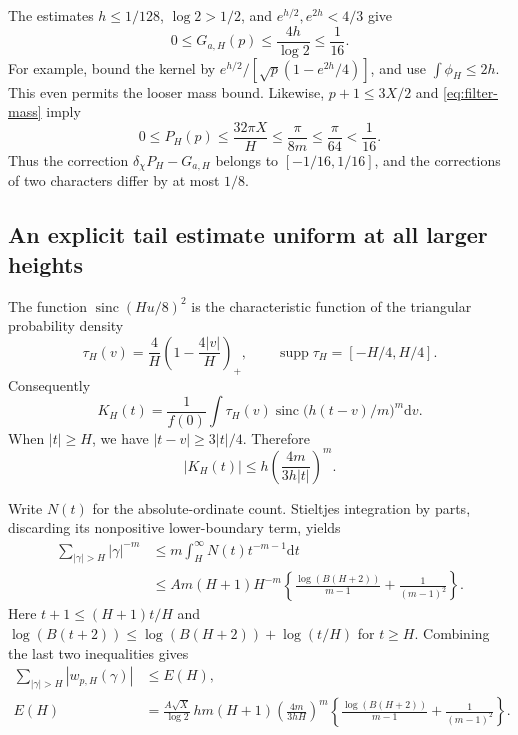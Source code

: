 \documentclass[11pt,letterpaper]{article}
\theoremstyle{definition}\newtheorem{definition}[theorem]{Definition}
\theoremstyle{remark}\newtheorem{remark}[theorem]{Remark}
\newcommand{\sinc}{\operatorname{sinc}}
\newcommand{\dd}{\mathrm{d}}
\begin{document}
The estimates $h\le1/128$, $\log2>1/2$, and
$e^{h/2},e^{2h}<4/3$ give
\begin{equation}\label{eq:gamma-small}
 0\le G_{a,H}(p)\le\frac{4h}{\log2}\le\frac1{16}.
\end{equation}
For example, bound the kernel by
$e^{h/2}/[\sqrt p(1-e^{2h}/4)]$, and use
$\int\phi_H\le2h$. This even permits the looser mass bound.
Likewise, $p+1\le3X/2$ and \eqref{eq:filter-mass} imply
\begin{equation}\label{eq:pole-small}
 0\le P_H(p)\le\frac{32\pi X}{H}
 \le\frac{\pi}{8m}\le\frac{\pi}{64}<\frac1{16}.
\end{equation}
Thus the correction $\delta_\chi P_H-G_{a,H}$ belongs to
$[-1/16,1/16]$, and the corrections of two characters differ by at
most $1/8$.

\subsection{An explicit tail estimate uniform at all larger heights}

The function $\sinc(Hu/8)^2$ is the characteristic function of the
triangular probability density
\[
 \tau_H(v)=\frac4H\left(1-\frac{4|v|}{H}\right)_+,
 \qquad \operatorname{supp}\tau_H=[-H/4,H/4].
\]
Consequently
\[
 K_H(t)=\frac1{f(0)}\int\tau_H(v)
                    \sinc\bigl(h(t-v)/m\bigr)^m\dd v.
\]
When $|t|\ge H$, we have $|t-v|\ge3|t|/4$. Therefore
\begin{equation}\label{eq:kernel-tail}
 |K_H(t)|\le h\left(\frac{4m}{3h|t|}\right)^m.
\end{equation}

Write $N(t)$ for the absolute-ordinate count. Stieltjes integration by
parts, discarding its nonpositive lower-boundary term, yields
\begin{align}
 \sum_{|\gamma|>H}|\gamma|^{-m}
 &\le m\int_H^\infty N(t)t^{-m-1}\dd t\nonumber\\
 &\le A m(H+1)H^{-m}
 \left\{\frac{\log(B(H+2))}{m-1}+\frac1{(m-1)^2}\right\}.
       \label{eq:power-tail}
\end{align}
Here $t+1\le(H+1)t/H$ and
$\log(B(t+2))\le\log(B(H+2))+\log(t/H)$ for $t\ge H$.
Combining the last two inequalities gives
\begin{align}
 \sum_{|\gamma|>H}|w_{p,H}(\gamma)|
 &\le E(H),\nonumber\\
 E(H)&=\frac{A\sqrt X}{\log2}\,hm(H+1)
 \left(\frac{4m}{3hH}\right)^m
 \left\{\frac{\log(B(H+2))}{m-1}+\frac1{(m-1)^2}\right\}.
       \label{eq:explicit-tail}
\end{align}
\end{document}

